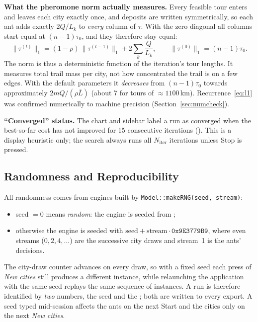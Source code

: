 \documentclass[11pt,a4paper]{article}
\begin{document}
\textbf{What the pheromone norm actually measures.} Every feasible tour enters and leaves each city exactly
once, and deposits are written symmetrically, so each ant adds exactly $2Q/L_k$ to \emph{every} column of
$\tau$. With the zero diagonal all columns start equal at $(n-1)\tau_0$, and they therefore stay equal:
\begin{equation}
\lVert\tau^{(t)}\rVert_1=(1-\rho)\,\lVert\tau^{(t-1)}\rVert_1+2\sum_{k}\frac{Q}{L_k},\qquad
\lVert\tau^{(0)}\rVert_1=(n-1)\tau_0 .
\label{eq:l1}
\end{equation}
The norm is thus a deterministic function of the iteration's tour lengths. It measures total trail mass
per city, not how concentrated the trail is on a few edges. With the default parameters it
\emph{decreases} from $(n-1)\tau_0$ towards approximately $2mQ/(\rho\bar L)$ (about 7 for tours of
${\approx}1100$\,km). Recurrence~\eqref{eq:l1} was confirmed numerically to machine precision
(Section~\ref{sec:numcheck}).

\textbf{``Converged'' status.} The chart and sidebar label a run as converged when the best-so-far cost has
not improved for 15 consecutive iterations (). This is a display
heuristic only; the search always runs all $N_{\text{iter}}$ iterations unless Stop is pressed.

\subsection{Randomness and Reproducibility}
All randomness comes from  engines built by \texttt{Model::makeRNG(seed, stream)}:
\begin{itemize}
  \item seed $=0$ means \emph{random}: the engine is seeded from ;
  \item otherwise the engine is seeded with $\text{seed}+\text{stream}\cdot\texttt{0x9E3779B9}$, where
        even streams ($0,2,4,\dots$) are the successive city draws and stream~1 is the ants' decisions.
\end{itemize}
The city-draw counter advances on every draw, so with a fixed seed each press of \emph{New cities} still
produces a different instance, while relaunching the application with the same seed replays the same
sequence of instances. A run is therefore identified by \emph{two} numbers, the seed and the
; both are written to every export. A seed typed mid-session affects the ants on the
next Start and the cities only on the next \emph{New cities}.
\end{document}
